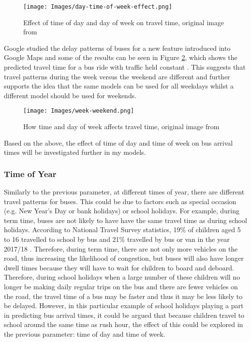 \begin{figure}[H]
\begin{center}
    \texttt{[image: Images/day-time-of-week-effect.png]}
    \caption{Effect of time of day and day of week on travel time, original image from \cite{dynamic-gps}}
    \label{fig:time-of-day-week}
\end{center}
\end{figure}

Google studied the delay patterns of buses for a new feature introduced into Google Maps and some of the results can be seen in Figure \ref{fig:week-vs-weekend}, which shows the predicted travel time for a bus ride with traffic held constant \cite{google-machine-learning}. This suggests that travel patterns during the week versus the weekend are different and further supports the idea that the same models can be used for all weekdays whilst a different model should be used for weekends.

\begin{figure}[H]
\begin{center}
    \texttt{[image: Images/week-weekend.png]}
    \caption{How time and day of week affects travel time, original image from \cite{google-machine-learning}}
    \label{fig:week-vs-weekend}
\end{center}
\end{figure}

Based on the above, the effect of time of day and time of week on bus arrival times will be investigated further in my models.

\subsubsection{Time of Year}
Similarly to the previous parameter, at different times of year, there are different travel patterns for buses. This could be due to factors such as special occasion (e.g. New Year's Day or bank holidays) or school holidays. For example, during term time, buses are not likely to have have the same travel time as during school holidays. According to National Travel Survey statistics, 19\% of children aged 5 to 16 travelled to school by bus and 21\% travelled by bus or van in the year 2017/18 \cite{children-school-travel-mode}. Therefore, during term time, there are not only more vehicles on the road, thus increasing the likelihood of congestion, but buses will also have longer dwell times because they will have to wait for children to board and deboard. Therefore, during school holidays when a large number of these children will no longer be making daily regular trips on the bus and there are fewer vehicles on the road, the travel time of a bus may be faster and thus it may be less likely to be delayed. However, in this particular example of school holidays playing a part in predicting bus arrival times, it could be argued that because children travel to school around the same time as rush hour, the effect of this could be explored in the previous parameter: time of day and time of week. \\

